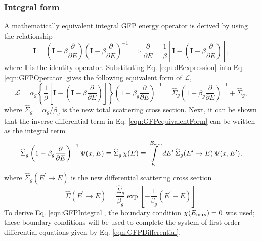 \subsubsection{Integral form}
A mathematically equivalent integral GFP energy operator is derived by using the relationship
\begin{equation} \label{eqn:dEexpression}
  \boldsymbol{I} = (\boldsymbol{I} - \beta \dfrac{\partial}{\partial E})(\boldsymbol{I} - \beta \dfrac{\partial}{\partial E})^{-1} \implies \dfrac{\partial}{\partial E} = \dfrac{1}{\beta} \left[\boldsymbol{I} - \left(\boldsymbol{I} - \beta \dfrac{\partial}{\partial E}\right)\right],
\end{equation}
where $\boldsymbol{I}$ is the identity operator. Substituting Eq. \eqref{eqn:dEexpression} into Eq. \eqref{eqn:GFPOperator} gives the following equivalent form of $\mathcal{L}$,
\begin{equation} \label{eqn:GFPequivalentForm}
  \mathcal{L} = \alpha_g \left\lbrace \dfrac{1}{\beta} \left[\boldsymbol{I} - \left(\boldsymbol{I} - \beta \dfrac{\partial}{\partial E}\right)\right] \right\rbrace \left(1 - \beta_g \dfrac{\partial}{\partial E}\right)^{-1} = \widehat{\Sigma}_g \left(1 - \beta_g \dfrac{\partial}{\partial E}\right)^{-1} + \widehat{\Sigma}_g,
\end{equation}
where $\widehat{\Sigma}_g = \alpha_g / \beta_g$ is the new total scattering cross section. Next, it can be shown that the inverse differential term in Eq. \eqref{eqn:GFPequivalentForm} can be written as the integral term
\begin{equation} \label{eqn:GFPIntegral}
  \widehat{\Sigma}_g \left(1 - \beta_g \dfrac{\partial}{\partial E}\right)^{-1} \Psi(x,E) \equiv \widehat{\Sigma}_g \, \chi(E) \equiv \int\limits_{E}^{\emax} dE^{\prime} \, \widehat{\Sigma}_g(E^{\prime}\rightarrow E) \, \Psi(x,E^{\prime}),
\end{equation}
where $\widehat{\Sigma}_g(E^{\prime}\rightarrow E)$ is the new differential scattering cross section
\begin{equation}
  \widehat{\Sigma}(E^{\prime}\rightarrow E) = \dfrac{\widehat{\Sigma}_g}{\beta_g} \exp \left[ - \dfrac{1}{\beta_g}(E^{\prime} - E)\right].
\end{equation}
To derive Eq. \eqref{eqn:GFPIntegral}, the boundary condition $\chi(E_{\text{max}}) = 0$ was used; these boundary conditions will be used to complete the system of first-order differential equations given by Eq. \eqref{eqn:GFPDifferential}.

